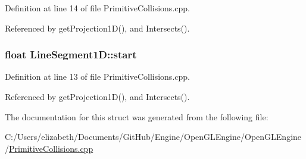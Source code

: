 Definition at line 14 of file Primitive\+Collisions.\+cpp.



Referenced by get\+Projection1\+D(), and Intersects().

\subsubsection[{\texorpdfstring{start}{start}}]{\setlength{\rightskip}{0pt plus 5cm}float Line\+Segment1\+D\+::start}\hypertarget{struct_line_segment1_d_a19765c9df2cc0037c58783590e5f3216}{}\label{struct_line_segment1_d_a19765c9df2cc0037c58783590e5f3216}


Definition at line 13 of file Primitive\+Collisions.\+cpp.



Referenced by get\+Projection1\+D(), and Intersects().



The documentation for this struct was generated from the following file\+:\begin{DoxyCompactItemize}
\item 
C\+:/\+Users/elizabeth/\+Documents/\+Git\+Hub/\+Engine/\+Open\+G\+L\+Engine/\+Open\+G\+L\+Engine/\hyperlink{_primitive_collisions_8cpp}{Primitive\+Collisions.\+cpp}\end{DoxyCompactItemize}
